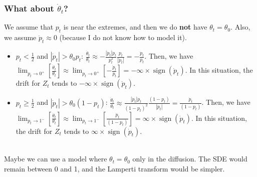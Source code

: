 \documentclass[aspectratio=169]{beamer}\usepackage[utf8]{inputenc}
\DeclareMathOperator{\sign}{sign}
\begin{document}
\begin{frame}\frametitle{What about $\dot{\theta}_t$?}

We assume that $p_t$ is near the extremes, and then we do \textbf{not} have $\theta_t=\theta_0$. Also, we assume $\ddot{p}_t\approx0$ (because I do not know how to model it).

\begin{itemize}

\item $p_t<\frac{1}{2}$ and $|\dot{p}_t|>\theta_0p_t$: $\frac{\dot{\theta}_t}{\theta_t}\approx-\frac{|\dot{p}_t|\dot{p}_t}{p_t^2}\frac{p_t}{|\dot{p}_t|}=-\frac{\dot{p}_t}{p_t}$. Then, we have $\lim_{p_t\to0^+}\left[\frac{\dot{\theta}_t}{\theta_t}\right]\approx\lim_{p_t\to0^+}\left[-\frac{\dot{p}_t}{p_t}\right]=-\infty\times\sign(\dot{p}_t)$. In this situation, the drift for $Z_t$ tends to $-\infty\times\sign(\dot{p}_t)$.
\item $p_t\geq\frac{1}{2}$ and $|\dot{p}_t|>\theta_0(1-p_t)$: $\frac{\dot{\theta}_t}{\theta_t}\approx\frac{|\dot{p}_t|\dot{p}_t}{(1-p_t)^2}\frac{(1-p_t)}{|\dot{p}_t|}=\frac{\dot{p}_t}{(1-p_t)}$. Then, we have $\lim_{p_t\to1^-}\left[\frac{\dot{\theta}_t}{\theta_t}\right]\approx\lim_{p_t\to1^-}\left[\frac{\dot{p}_t}{(1-p_t)}\right]=\infty\times\sign(\dot{p}_t)$. In this situation, the drift for $Z_t$ tends to $\infty\times\sign(\dot{p}_t)$.

\end{itemize}
\quad\\
\alert{Maybe we can use a model where $\theta_t=\theta_0$ only in the diffusion. The SDE would remain between 0 and 1, and the Lamperti transform would be simpler.}

\end{frame}


%
%
%
\end{document}
